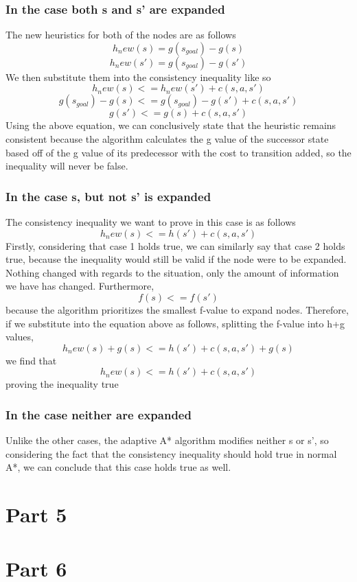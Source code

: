 \documentclass{article}
\begin{document}
\subsubsection{In the case both s and s' are expanded}
The new heuristics for both of the nodes are as follows
\begin{equation}
h_new(s) = g(s_{goal})-g(s)
\end{equation}
\begin{equation}
h_new(s') = g(s_{goal})-g(s')
\end{equation}
We then substitute them into the consistency inequality like so
\begin{equation}
h_new(s) <= h_new(s')+c(s,a,s')
\end{equation}
\begin{equation}
g(s_{goal}) - g(s) <= g(s_{goal}) - g(s') + c(s,a,s')
\end{equation}
\begin{equation}
g(s') <= g(s) + c(s,a,s')
\end{equation}
Using the above equation, we can conclusively state that the heuristic remains consistent because the algorithm calculates the g value of the successor state based off of the g value of its predecessor with the cost to transition added, so the inequality will never be false.
\subsubsection{In the case s, but not s' is expanded}
The consistency inequality we want to prove in this case is as follows
\begin{equation}
h_new(s) <= h(s') + c(s,a,s')
\end{equation}
Firstly, considering that case 1 holds true, we can similarly say that case 2 holds true, because the inequality would still be valid if the node were to be expanded. Nothing changed with regards to the situation, only the amount of information we have has changed. 
Furthermore,
\begin{equation}
f(s) <= f(s')
\end{equation}
because the algorithm prioritizes the smallest f-value to expand nodes. Therefore, if we substitute into the equation above as follows, splitting the f-value into h+g values,
\begin{equation}
	h_new(s) + g(s) <= h(s') + c(s,a,s') + g(s)
\end{equation}
we find that 
\begin{equation}
h_new(s) <= h(s') + c(s,a,s')
\end{equation}
proving the inequality true
\subsubsection{In the case neither are expanded}
Unlike the other cases, the adaptive A* algorithm modifies neither s or s', so considering the fact that the consistency inequality should hold true in normal A*, we can conclude that this case holds true as well.
\section{Part 5}

\section{Part 6}
\end{document}
